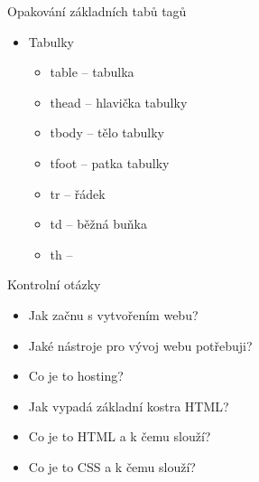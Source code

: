 \documentclass{beamer}
\begin{document}
\begin{frame}[shrink]{Opakování základních tabů tagů}
\begin{multicols}{2}
	\begin{itemize}	
		\item Tabulky
		\begin{itemize}
			\item table -- tabulka
			\item thead -- hlavička tabulky
			\item tbody -- tělo tabulky
			\item tfoot -- patka tabulky
			\item tr -- řádek
			\item td -- běžná buňka
			\item th -- 
		\end{itemize}
	\end{itemize}


\end{multicols}
\end{frame}


\begin{frame}{Kontrolní otázky}
\begin{itemize}
	\item Jak začnu s vytvořením webu?
	\item Jaké nástroje pro vývoj webu potřebuji?
	\item Co je to hosting?
	\item Jak vypadá základní kostra HTML?
	\item Co je to HTML a k čemu slouží?
	\item Co je to CSS a k čemu slouží?
\end{itemize}
	
\end{frame}


	  
\end{document}
